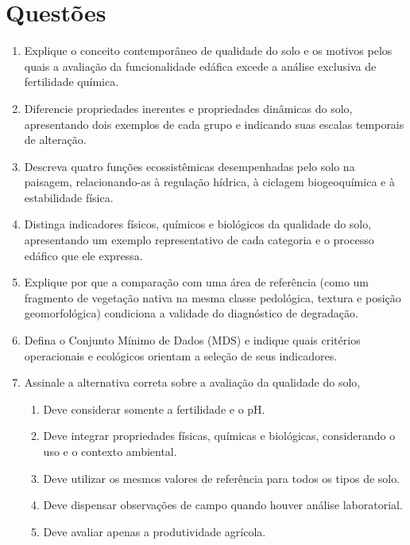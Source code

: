 \documentclass[11pt,a4paper]{article}
\begin{document}
\section{Questões}

\begin{enumerate}[leftmargin=*, itemsep=6pt]
  \item Explique o conceito contemporâneo de qualidade do solo e os motivos pelos quais a avaliação da funcionalidade edáfica excede a análise exclusiva de fertilidade química.

  \item Diferencie propriedades inerentes e propriedades dinâmicas do solo, apresentando dois exemplos de cada grupo e indicando suas escalas temporais de alteração.

  \item Descreva quatro funções ecossistêmicas desempenhadas pelo solo na paisagem, relacionando-as à regulação hídrica, à ciclagem biogeoquímica e à estabilidade física.

  \item Distinga indicadores físicos, químicos e biológicos da qualidade do solo, apresentando um exemplo representativo de cada categoria e o processo edáfico que ele expressa.

  \item Explique por que a comparação com uma área de referência (como um fragmento de vegetação nativa na mesma classe pedológica, textura e posição geomorfológica) condiciona a validade do diagnóstico de degradação.

  \item Defina o Conjunto Mínimo de Dados (MDS) e indique quais critérios operacionais e ecológicos orientam a seleção de seus indicadores.

  \item Assinale a alternativa correta sobre a avaliação da qualidade do solo,
  \begin{enumerate}[label=(\Alph*), leftmargin=1.5em, itemsep=2pt, topsep=3pt]
    \item Deve considerar somente a fertilidade e o pH.
    \item Deve integrar propriedades físicas, químicas e biológicas, considerando o uso e o contexto ambiental.
    \item Deve utilizar os mesmos valores de referência para todos os tipos de solo.
    \item Deve dispensar observações de campo quando houver análise laboratorial.
    \item Deve avaliar apenas a produtividade agrícola.
  \end{enumerate}


\end{enumerate}
\end{document}
